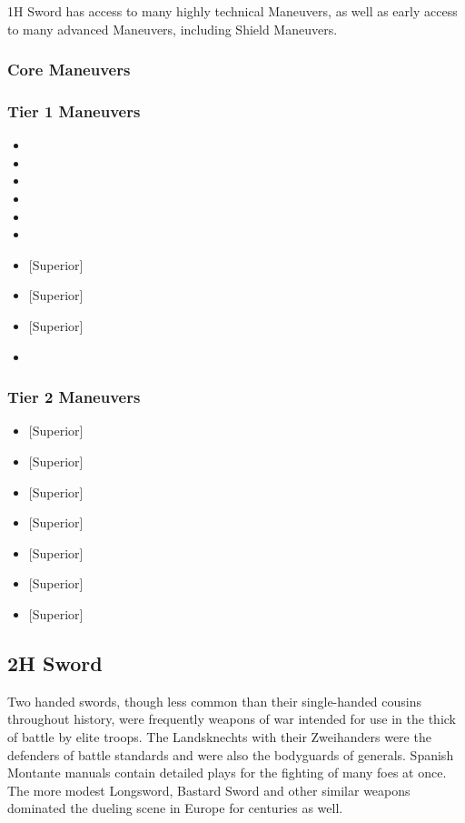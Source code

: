 \documentclass[oneside,11pt,english]{book}
\begin{document}
1H Sword has access to many highly technical Maneuvers, as well as early access to many advanced Maneuvers, including Shield Maneuvers.

\subsubsection{Core Maneuvers}

\subsubsection{Tier 1 Maneuvers}
\vspace{-5pt}\begin{itemize}
  [itemsep=0.5mm]
\item {}
\item {}
\item {}
\item {}
\item {}
\item {}
\item {} [Superior]
\item {} [Superior]
\item {} [Superior]
\item {}
\end{itemize}
\subsubsection{Tier 2 Maneuvers}
\vspace{-5pt}\begin{itemize}
  [itemsep=0.5mm]
\item {} [Superior]
\item {} [Superior]
\item {} [Superior]
\item {} [Superior]
\item {} [Superior]
\item {} [Superior]
\item {} [Superior]
\end{itemize}

\subsection{2H Sword}
Two handed swords, though less common than their single-handed cousins
throughout history, were frequently weapons of war intended for use in the thick
of battle by elite troops. The Landsknechts with their Zweihanders were the
defenders of battle standards and were also the bodyguards of generals. Spanish
Montante manuals contain detailed plays for the fighting of many foes at once.
The more modest Longsword, Bastard Sword and other similar weapons dominated the
dueling scene in Europe for centuries as well.  
\end{document}
